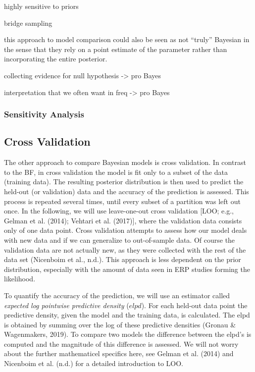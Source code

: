 \documentclass[
  doc,12pt,floatsintext]{apa7}
\begin{document}
highly sensitive to priors

bridge sampling

this approach to model comparison could also be seen as not ``truly''
Bayesian in the sense that they rely on a point estimate of the parameter rather than incorporating
the entire posterior.

collecting evidence for null hypothesis -\textgreater{} pro Bayes

interpretation that we often want in freq -\textgreater{} pro Bayes

\subsubsection{Sensitivity Analysis}\label{sensitivity-analysis}



\subsection{Cross Validation}\label{cross-validation}

The other approach to compare Bayesian models is cross validation. In contrast to the BF, in cross validation the model is fit only to a subset of the data (training data). The resulting posterior distribution is then used to predict the held-out (or validation) data and the accuracy of the prediction is assessed. This process is repeated several times, until every subset of a partition was left out once. In the following, we will use leave-one-out cross validation {[}LOO; e.g., Gelman et al. (2014); Vehtari et al. (2017){]}, where the validation data consists only of one data point. Cross validation attempts to assess how our model deals with new data and if we can generalize to out-of-sample data. Of course the validation data are not actually new, as they were collected with the rest of the data set (Nicenboim et al., n.d.). This approach is less dependent on the prior distribution, especially with the amount of data seen in ERP studies forming the likelihood.

To quantify the accuracy of the prediction, we will use an estimator called \emph{expected log pointwise predictive density} (\(elpd\)). For each held-out data point the predictive density, given the model and the training data, is calculated. The elpd is obtained by summing over the log of these predictive densities (Gronau \& Wagenmakers, 2019). To compare two models the difference between the elpd's is computed and the magnitude of this difference is assessed. We will not worry about the further mathematicel specifics here, see Gelman et al. (2014) and Nicenboim et al. (n.d.) for a detailed introduction to LOO.
\end{document}
